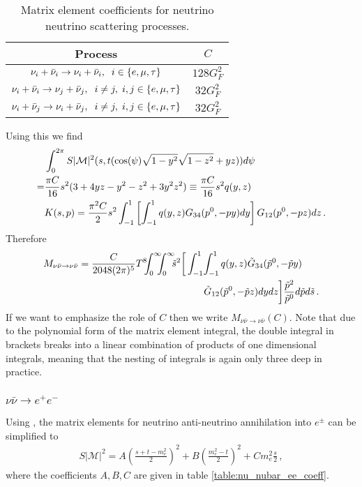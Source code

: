\begin{table}[ht]
\centering 
\begin{tabular}{|c|c|}
\hline
Process &$C$  \\
\hline
$\nu_i+\bar\nu_i\rightarrow\nu_i+\bar\nu_i,\hspace{2mm} i\in\{e,\mu,\tau\}$& $128 G_F^2$\\
\hline
$\nu_i+\bar\nu_i\rightarrow\nu_j+\bar\nu_j,\hspace{2mm} i\neq j, \hspace{1mm} i,j\in\{e,\mu,\tau\}$& $32 G_F^2$\\
\hline
$\nu_i+\bar\nu_j\rightarrow\nu_i+\bar\nu_j,\hspace{2mm} i\neq j, \hspace{1mm} i,j\in\{e,\mu,\tau\}$& $32 G_F^2$\\
\hline
\end{tabular}
\caption{Matrix element coefficients for neutrino neutrino scattering processes.}
\label{table:nu_nubar_coeff}
\end{table}
Using this we find
 \begin{align}
&\int_0^{2\pi} S |\mathcal{M}|^2 (s,t(\cos(\psi)\sqrt{1-y^2}\sqrt{1-z^2}+yz))d\psi\\
=&\frac{\pi C}{16} s^2(3+4 yz-y^2-z^2+3y^2z^2)
\equiv\frac{\pi C}{16} s^2q(y,z)\,\notag\\
&K(s,p)=\frac{\pi^2C}{2}s^2\int_{-1}^1 \left[\int_{-1}^1q(y,z)G_{34}(p^0,-p y) dy\right] G_{12}(p^0,-p z)dz\,.\notag
\end{align}
Therefore
\begin{align}
&M_{\nu\bar\nu\rightarrow\nu\bar\nu}=\frac{C}{2048(2\pi)^5 }T^8\!\!\!\int_0^\infty\!\!\!\!\int_0^\infty\!\!\! \tilde{s}^2\bigg[\int_{-1}^1\!\int_{-1}^1q(y,z)\tilde{G}_{34}(\tilde p^0,-\tilde{p} y)\notag\\
&\hspace{58mm}\tilde{G}_{12}(\tilde p^0,-\tilde{p} z)dydz\bigg]\frac{\tilde{p}^2}{\tilde{p}^0}d\tilde{p}d\tilde{s}\,.\notag
\end{align}
 If we want to emphasize the role of $C$ then we write $M_{\nu\bar\nu\rightarrow\nu\bar\nu}(C)$. Note that due to the polynomial form of the matrix element integral, the double integral in brackets breaks into a linear combination of products of one dimensional integrals, meaning that the nesting of integrals is again only three deep in  practice.

\subsubsection{$\nu\bar{\nu}\rightarrow e^+e^-$}\label{nu_nubar_int}
Using , the matrix elements for neutrino anti-neutrino annihilation into $e^\pm$ can be simplified to
\begin{align}
S|\mathcal{M}|^2=A\left(\frac{s+t-m_e^2}{2}\right)^2+B\left(\frac{m_e^2-t}{2}\right)^2+Cm_e^2\frac{s}{2}\,,
\end{align}
where the coefficients $A,B,C$ are given in table \ref{table:nu_nubar_ee_coeff}.

